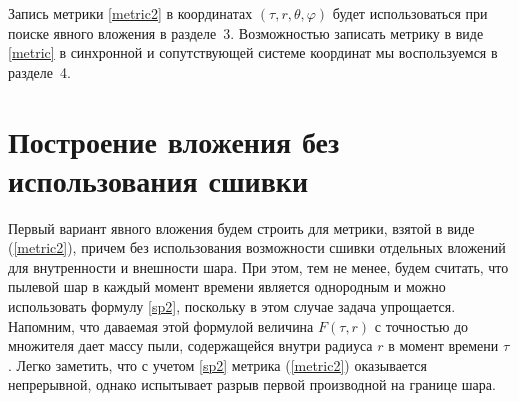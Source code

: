 \documentclass[12pt]{article}
\begin{document}
Запись метрики \eqref{metric2} в координатах $(\tau, r, \theta, \varphi)$ будет использоваться при поиске явного вложения в разделе~3.
Возможностью записать метрику в виде \eqref{metric} в синхронной и сопутствующей системе координат мы воспользуемся в разделе~4.



\section{Построение вложения без использования сшивки}
Первый вариант явного вложения будем строить для метрики, взятой в виде (\ref{metric2}),
причем без использования возможности сшивки отдельных вложений для внутренности и внешности шара.
При этом, тем не менее, будем считать, что пылевой шар в каждый момент времени является однородным и можно использовать формулу
\eqref{sp2}, поскольку в этом случае задача упрощается.
Напомним, что даваемая этой формулой величина $F(\tau, r)$ с точностью до множителя дает массу пыли,
содержащейся внутри радиуса $r$ в момент времени $\tau$.
Легко заметить, что с учетом \eqref{sp2} метрика (\ref{metric2}) оказывается непрерывной, однако испытывает разрыв первой производной на границе шара.
\end{document}

